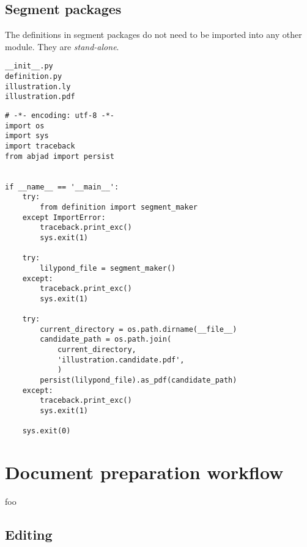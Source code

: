 \subsection{Segment packages}

The definitions in segment packages do not need to be imported into any other
module. They are \emph{stand-alone}.

\begin{singlespacing}
\vspace{-0.5\baselineskip}
\begin{lstlisting}
__init__.py
definition.py
illustration.ly
illustration.pdf
\end{lstlisting}
\end{singlespacing}

\begin{singlespacing}
\vspace{-0.5\baselineskip}
\begin{lstlisting}
# -*- encoding: utf-8 -*-
import os
import sys
import traceback
from abjad import persist


if __name__ == '__main__':
    try:
        from definition import segment_maker
    except ImportError:
        traceback.print_exc()
        sys.exit(1)

    try:
        lilypond_file = segment_maker()
    except:
        traceback.print_exc()
        sys.exit(1)

    try:
        current_directory = os.path.dirname(__file__)
        candidate_path = os.path.join(
            current_directory,
            'illustration.candidate.pdf',
            )
        persist(lilypond_file).as_pdf(candidate_path)
    except:
        traceback.print_exc()
        sys.exit(1)

    sys.exit(0)
\end{lstlisting}
\end{singlespacing}

\section{Document preparation workflow}

foo

\subsection{Editing}

